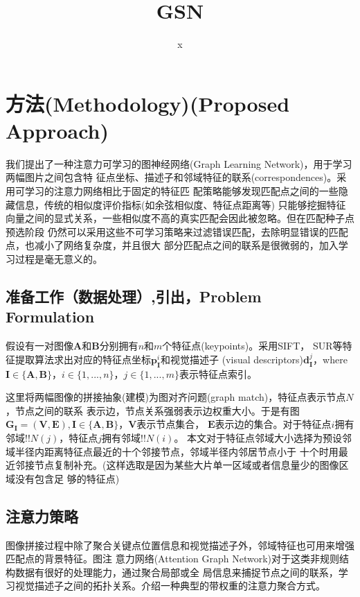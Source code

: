 \documentclass[10pt]{article}
\title{\textbf{GSN}}
\author{x}
\date{}
\begin{document}
\maketitle
\setcounter{page}{0}
\maketitle
\section{方法(Methodology)(Proposed Approach)}
我们提出了一种注意力可学习的图神经网络(Graph Learning Network)，用于学习两幅图片之间包含特
征点坐标、描述子和邻域特征的联系(correspondences)。采用可学习的注意力网络相比于固定的特征匹
配策略能够发现匹配点之间的一些隐藏信息，传统的相似度评价指标(如余弦相似度、特征点距离等)
只能够挖掘特征向量之间的显式关系，一些相似度不高的真实匹配会因此被忽略。但在匹配种子点预选阶段
仍然可以采用这些不可学习策略来过滤错误匹配，去除明显错误的匹配点，也减小了网络复杂度，并且很大
部分匹配点之间的联系是很微弱的，加入学习过程是毫无意义的。 
\subsection{准备工作（数据处理）,引出，Problem Formulation}

假设有一对图像$\mathbf{A}$和$\mathbf{B}$分别拥有$n$和$m$个特征点(keypoints)。采用SIFT，
SUR等特征提取算法求出对应的特征点坐标$\mathbf{p}_{\mathbf{I}}^{i}$和视觉描述子
(visual descriptors)$\mathbf{d}_{\mathbf{I}}^{j}$，where $\mathbf{I}\in 
\{\mathbf{A,B}\}$，$i\in\{1,...,n\}$，$j\in\{1,...,m\}$表示特征点索引。

这里将两幅图像的拼接抽象(建模)为图对齐问题(graph match)，特征点表示节点$N$，节点之间的联系
表示边，节点关系强弱表示边权重大小。于是有图$\mathbf{G}_{\mathbf{I}}=(\mathbf{V},
\mathbf{E}),\mathbf{I}\in\{\mathbf{A},\mathbf{B}\}$，$\mathbf{V}$表示节点集合，
$\mathbf{E}$表示边的集合。对于特征点$i$拥有邻域!!$N(j)$，特征点$j$拥有邻域!!$N(i)$。
本文对于特征点邻域大小选择为预设邻域半径内距离特征点最近的十个邻接节点，邻域半径内邻居节点小于
十个时用最近邻接节点复制补充。(这样选取是因为某些大片单一区域或者信息量少的图像区域没有包含足
够的特征点)

\subsection{注意力策略} 
图像拼接过程中除了聚合关键点位置信息和视觉描述子外，邻域特征也可用来增强匹配点的背景特征。图注
意力网络(Attention Graph Network)对于这类非规则结构数据有很好的处理能力，通过聚合局部或全
局信息来捕捉节点之间的联系，学习视觉描述子之间的拓扑关系。介绍一种典型的带权重的注意力聚合方式。
\cite{Sattler2018}
\end{document}
